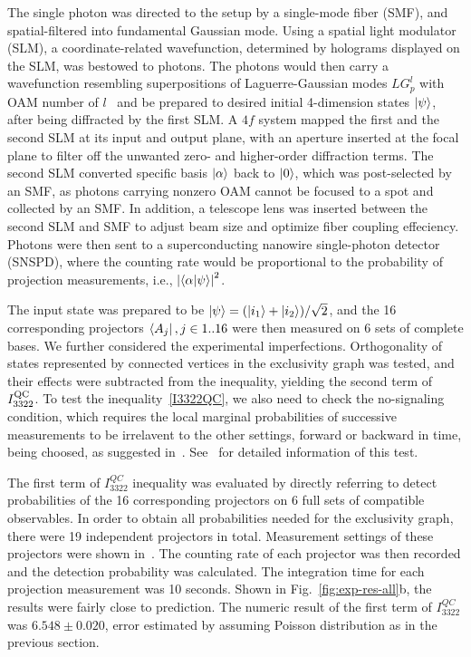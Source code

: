\documentclass[prl,letterpaper,english,reprint,nofootinbib,aps,superscriptaddress,showpacs,showkeys]{revtex4-1}
\theoremstyle{definition}
\theoremstyle{remark}
\begin{document}
 The single photon was directed to the setup by a single-mode fiber (SMF), and spatial-filtered into fundamental Gaussian mode.
 Using a spatial light modulator (SLM), a coordinate-related wavefunction, determined by holograms displayed on the SLM, was bestowed to photons.
 The photons would then carry a wavefunction resembling superpositions of Laguerre-Gaussian modes $LG_p^l$ with OAM number of $l$~\cite{allen92} and be prepared to desired initial 4-dimension states $\ket{\psi}$, after being diffracted by the first SLM.
 A $4f$ system mapped the first and the second SLM at its input and output plane, with an aperture inserted at the focal plane to filter off the unwanted zero- and higher-order diffraction terms.
 The second SLM converted specific basis $\ket{\alpha}$ back to $\ket{0}$, which was post-selected by an SMF, as photons carrying nonzero OAM cannot be focused to a spot and collected by an SMF.
 In addition, a telescope lens was inserted between the second SLM and SMF to adjust beam size and optimize fiber coupling effeciency.
 Photons were then sent to a superconducting nanowire single-photon detector (SNSPD), where the counting rate would be proportional to the probability of projection measurements, i.e., $\left|\braket{\alpha|\psi}\right|^2$.
 
 The input state was prepared to be $\ket{\psi} = (\ket{i_1}+\ket{i_2})/\sqrt{2}$, and the 16 corresponding projectors $\bra{A_j}, j\in1..16$ were then measured on 6 sets of complete bases.
 We further considered the experimental imperfections. Orthogonality of states represented by connected vertices in the exclusivity graph was tested, and their effects were subtracted from the inequality, yielding the second term of $I_{3322}^{\rm QC}$. 
 To test the inequality~\ref{I3322QC}, we also need to check the no-signaling condition, which requires the local marginal probabilities of successive measurements to be irrelavent to the other settings, forward or backward in time, being choosed, as suggested in~\cite{cabello16}. See~\cite{SM} for detailed information of this test.

 The first term of $I_{3322}^{QC}$ inequality was evaluated by directly referring to detect probabilities of the 16 corresponding projectors on $6$ full sets of compatible observables. In order to obtain all probabilities needed for the exclusivity graph, there were 19 independent projectors in total.
 Measurement settings of these projectors were shown in~\cite{SM}.
 The counting rate of each projector was then recorded and the detection probability was calculated. The integration time for each projection measurement was 10 seconds. Shown in Fig.~\ref{fig:exp-res-all}b, the results were fairly close to prediction.
 The numeric result of the first term of $I_{3322}^{QC}$ was $6.548 \pm 0.020$, error estimated by assuming Poisson distribution as in the previous section.
\end{document}

